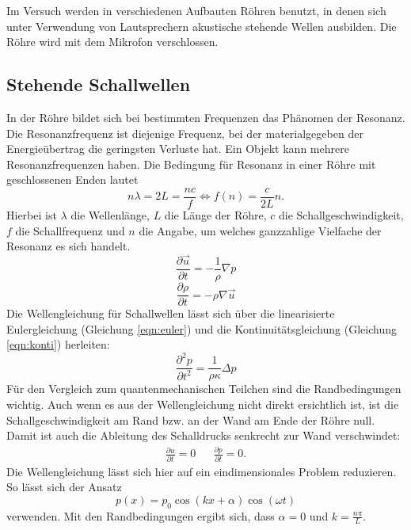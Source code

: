 Im Versuch werden in verschiedenen Aufbauten Röhren benutzt, in denen sich unter Verwendung von Lautsprechern akustische stehende Wellen ausbilden.
Die Röhre wird mit dem Mikrofon verschlossen.\\
%
\subsection{Stehende Schallwellen}
In der Röhre bildet sich bei bestimmten Frequenzen das Phänomen der Resonanz.
Die Resonanzfrequenz ist diejenige Frequenz, bei der materialgegeben der Energieübertrag die geringsten Verluste hat.
Ein Objekt kann mehrere Resonanzfrequenzen haben.
Die Bedingung für Resonanz in einer Röhre mit geschlossenen Enden lautet
\begin{equation}
  n \lambda = 2 L = \frac{n c}{f} \Leftrightarrow f(n) = \frac{c}{2L} n.
  \label{eqn:resonanz}
\end{equation}
Hierbei ist $\lambda$ die Wellenlänge, $L$ die Länge der Röhre, $c$ die Schallgeschwindigkeit, $f$ die Schallfrequenz und $n$ die Angabe, um welches ganzzahlige Vielfache der Resonanz es sich handelt.\\
%
\begin{equation}
  \frac{ \partial \vec{u}}{ \partial t} = - \frac{1}{\rho} \nabla p
  \label{eqn:euler}
\end{equation}
\begin{equation}
  \frac{\partial \rho}{ \partial t} = - \rho \nabla \vec{u}
  \label{eqn:konti}
\end{equation}
%
Die Wellengleichung für Schallwellen lässt sich über die linearisierte Eulergleichung (Gleichung \eqref{eqn:euler}) und die Kontinuitätsgleichung (Gleichung \eqref{eqn:konti}) herleiten:
\begin{equation}
  \frac{ \partial^2 p}{\partial t^2} = \frac{1}{\rho \kappa} \Delta p
  \label{eqn:schallwelle}
\end{equation}
Für den Vergleich zum quantenmechanischen Teilchen sind die Randbedingungen wichtig.
Auch wenn es aus der Wellengleichung nicht direkt ersichtlich ist, ist die Schallgeschwindigkeit am Rand bzw. an der Wand am Ende der Röhre null.
Damit ist auch die Ableitung des Schalldrucks senkrecht zur Wand verschwindet:
\begin{align*}
  \frac{ \partial u }{\partial t} = 0 && \frac{ \partial p }{ \partial t} = 0.
\end{align*}
Die Wellengleichung lässt sich hier auf ein eindimensionales Problem reduzieren.
So lässt sich der Ansatz
\begin{equation*}
  p(x)=p_{0} \cos{(kx + \alpha)} \cos{(\omega t)}
\end{equation*}
verwenden.
Mit den Randbedingungen ergibt sich, dass $\alpha=0$ und $k= \frac{n \pi}{L}$.
%
